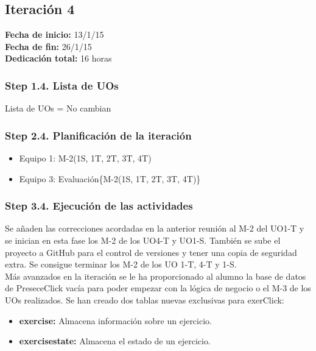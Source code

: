 \subsection{Iteración 4}
\label{it4}

\begin{flushleft}
\textbf{Fecha de inicio:} 13/1/15\\
\textbf{Fecha de fin:} 26/1/15\\
\textbf{Dedicación total:} 16 horas\\
\end{flushleft}

\subsubsection{Step 1.4. Lista de UOs}
\label{it4:1.4}

Lista de UOs = No cambian

\subsubsection{Step 2.4. Planificación de la iteración}
\label{it4:2.4}

\begin{itemize}
\item Equipo 1: M-2(1S, 1T, 2T, 3T, 4T)
\item Equipo 3: Evaluación\{M-2(1S, 1T, 2T, 3T, 4T)\}
\end{itemize}

\subsubsection{Step 3.4. Ejecución de las actividades}
\label{it4:3.4}

Se añaden las correcciones acordadas en la anterior reunión al M-2 del UO1-T y se inician en esta fase los M-2 de los UO4-T y UO1-S. También se sube el proyecto a GitHub para el control de versiones y tener una copia de seguridad extra. Se consigue terminar los M-2 de los UO 1-T, 4-T y 1-S.\\

Más avanzados en la iteración se le ha proporcionado al alumno la base de datos de PreseceClick vacía para poder empezar con la lógica de negocio o el M-3 de los UOs realizados. Se han creado dos tablas nuevas exclusivas para exerClick:

\begin{itemize}
\item \textbf{exercise:} Almacena información sobre un ejercicio.
\item \textbf{exercisestate:} Almacena el estado de un ejercicio.
\end{itemize}

